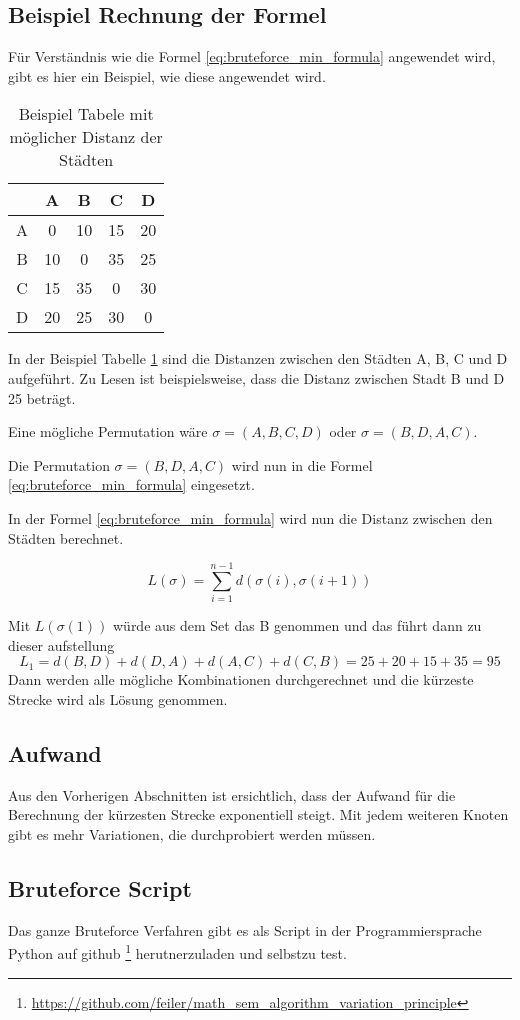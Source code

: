 \subsection{Beispiel Rechnung der Formel}
Für Verständnis wie die Formel \ref{eq:bruteforce_min_formula} angewendet wird, 
gibt es hier ein Beispiel, wie diese angewendet wird.

\begin{table}[h]
    \centering
    \begin{tabular}{|c|c|c|c|c|}
    \hline
       & A  & B  & C  & D  \\ \hline
    A  & 0  & 10 & 15 & 20 \\ \hline
    B  & 10 & 0  & 35 & 25 \\ \hline
    C  & 15 & 35 & 0  & 30 \\ \hline
    D  & 20 & 25 & 30 & 0  \\ \hline
    \end{tabular}
    \caption{Beispiel Tabele mit möglicher Distanz der Städten}
    \label{tab:example_bruteforce_cities}
\end{table}
    
In der Beispiel Tabelle \ref{tab:example_bruteforce_cities} sind die Distanzen zwischen den Städten A, B, C und D aufgeführt.
Zu Lesen ist beispielsweise, dass die Distanz zwischen Stadt B und D 25 beträgt.

Eine mögliche Permutation wäre \(\sigma = (A, B, C, D)\) oder \(\sigma = (B, D, A, C)\).

Die Permutation \(\sigma = (B, D, A, C)\) wird nun in die Formel \ref{eq:bruteforce_min_formula} eingesetzt.

In der Formel \ref{eq:bruteforce_min_formula} wird nun die Distanz zwischen den Städten berechnet.

\begin{equation}
    \label{eq:bruteforce_min_formula}
    L(\sigma) = \sum_{i=1}^{n-1} d(\sigma(i), \sigma(i+1))
\end{equation}

Mit \( L(\sigma(1)) \) würde aus dem Set das B genommen und das führt dann zu dieser aufstellung
\begin{equation}
    \label{eq:bruteforce_min_formula}
        L_1 = d(B, D) + d(D, A) + d(A, C) + d(C, B)
            = 25 + 20 + 15 + 35 = 95
\end{equation}
Dann werden alle mögliche Kombinationen durchgerechnet und die kürzeste Strecke wird als Lösung genommen.

\subsection{Aufwand}
Aus den Vorherigen Abschnitten ist ersichtlich, dass der Aufwand für die Berechnung der kürzesten Strecke
exponentiell steigt. Mit jedem weiteren Knoten gibt es mehr Variationen, die durchprobiert werden müssen.

\subsection{Bruteforce Script}
Das ganze Bruteforce Verfahren gibt es als Script in der Programmiersprache Python auf github 
\footnote{\url{https://github.com/feiler/math_sem_algorithm_variation_principle}}
\cite{algorythm:repo}
herutnerzuladen und selbstzu test.


